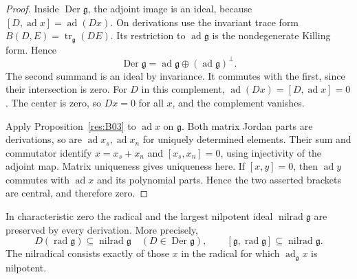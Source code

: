 \begin{proof}
Inside \(\operatorname{Der}\mathfrak g\), the adjoint
image is an ideal, because
\([D,\operatorname{ad}x]=\operatorname{ad}(Dx)\).
On derivations use the invariant trace form
\(B(D,E)=\operatorname{tr}_{\mathfrak g}(DE)\).
Its restriction to \(\operatorname{ad}\mathfrak g\)
is the nondegenerate Killing form. Hence
\[
 \operatorname{Der}\mathfrak g
 =\operatorname{ad}\mathfrak g\oplus
   (\operatorname{ad}\mathfrak g)^\perp.
\]
The second summand is an ideal by invariance.
It commutes with the first, since their intersection
is zero. For \(D\) in this complement,
\(\operatorname{ad}(Dx)=[D,\operatorname{ad}x]=0\).
The center is zero, so \(Dx=0\) for all \(x\), and
the complement vanishes.

Apply Proposition~\ref{res:B03} to
\(\operatorname{ad}x\) on \(\mathfrak g\).
Both matrix Jordan parts are derivations, so are
\(\operatorname{ad}x_s,\operatorname{ad}x_n\)
for uniquely determined elements. Their sum and
commutator identify \(x=x_s+x_n\) and
\([x_s,x_n]=0\), using injectivity of the adjoint
map. Matrix uniqueness gives uniqueness here.
If \([x,y]=0\), then \(\operatorname{ad}y\)
commutes with \(\operatorname{ad}x\) and its
polynomial parts. Hence the two asserted brackets
are central, and therefore zero.
\end{proof}

\begin{theorem}\label{res:B08}
In characteristic zero the radical and the largest nilpotent
ideal \(\operatorname{nilrad}\mathfrak g\) are preserved by
every derivation. More precisely,
\[
 D(\operatorname{rad}\mathfrak g)
       \subseteq\operatorname{nilrad}\mathfrak g
 \quad(D\in\operatorname{Der}\mathfrak g),\qquad
 [\mathfrak g,\operatorname{rad}\mathfrak g]
       \subseteq\operatorname{nilrad}\mathfrak g.
 \tag{2.5}\label{eq:nilrad-characteristic}
\]
The nilradical consists exactly of those \(x\) in the
radical for which \(\operatorname{ad}_{\mathfrak g}x\)
is nilpotent.
\end{theorem}

